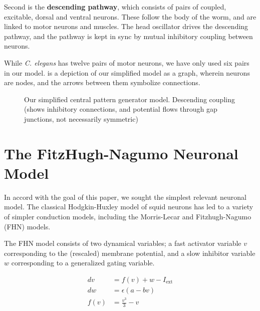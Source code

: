 \documentclass[
    11pt,
]{article}
\begin{document}
Second is the \textbf{descending pathway}, which consists of pairs of coupled, excitable, dorsal and ventral neurons.  These follow the body of the worm, and are linked to motor neurons and muscles.  The head oscillator drives the descending pathway, and the pathway is kept in sync by mutual inhibitory coupling between neurons.


While \textit{C. elegans} has twelve pairs of motor neurons, we have only used six pairs in our model.   is a depiction of our simplified model as a graph, wherein neurons are nodes, and the arrows between them symbolize connections.

\begin{figure}[h!]
    \label{fig: cpg}
    \centering
    \caption{Our simplified central pattern generator model.  Descending coupling (shows inhibitory connections, and potential flows through gap junctions, not necessarily symmetric)}
\end{figure} %

\section{The FitzHugh-Nagumo Neuronal Model}\label{sec: fhn}

In accord with the goal of this paper, we sought the simplest relevant neuronal model.  The classical Hodgkin-Huxley\cite{hodgkin1952} model of squid neurons has led to a variety of simpler conduction models, including the Morris-Lecar\cite{morris1981} and Fitzhugh-Nagumo (FHN) models.

The FHN model consists of two dynamical variables; a fast activator variable $v$ corresponding to the (rescaled) membrane potential, and a slow inhibitor variable $w$ corresponding to a generalized gating variable.

\begin{equation} %
    \label{eq: fhn}
    \begin{aligned}
        dv &= f(v) + w - I_\mathrm{ext}\\
        dw &= ϵ(a - bv)\\
        f(v) &= \frac{v^3}{3} - v
    \end{aligned}
\end{equation}
\end{document}
